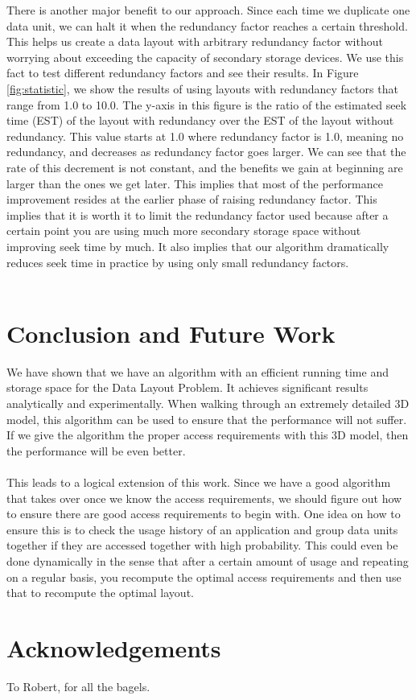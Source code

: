 \documentclass[conference]{acmsiggraph}
\begin{document}
There is another major benefit to our approach. Since each time we duplicate one data unit, we can halt it when the redundancy factor reaches a certain threshold. This helps us create a data layout with arbitrary redundancy factor without worrying about exceeding the capacity of secondary storage devices. We use this fact to test different redundancy factors and see their results. In Figure \ref{fig:statistic}, we show the results of using layouts with redundancy factors that range from 1.0 to 10.0. The y-axis in this figure is the ratio of the estimated seek time (EST) of the layout with redundancy over the EST of the layout without redundancy. This value starts at 1.0 where redundancy factor is 1.0, meaning no redundancy, and decreases as redundancy factor goes larger. We can see that the rate of this decrement is not constant, and the benefits we gain at beginning are larger than the ones we get later. This implies that most of the performance improvement resides at the earlier phase of raising redundancy factor. This implies that it is worth it to limit the redundancy factor used because after a certain point you are using much more secondary storage space without improving seek time by much. It also implies that our algorithm dramatically reduces seek time in practice by using only small redundancy factors. \\  
\\


\section{Conclusion and Future Work}

We have shown that we have an algorithm with an efficient running time and storage space for the Data Layout Problem. It achieves significant results analytically and experimentally. When walking through an extremely detailed 3D model, this algorithm can be used to ensure that the performance will not suffer. If we give the algorithm the proper access requirements with this 3D model, then the performance will be even better.\\
\\
This leads to a logical extension of this work. Since we have a good algorithm that takes over once we know the access requirements, we should figure out how to ensure there are good access requirements to begin with. One idea on how to ensure this is to check the usage history of an application and group data units together if they are accessed together with high probability. This could even be done dynamically in the sense that after a certain amount of usage and repeating on a regular basis, you recompute the optimal access requirements and then use that to recompute the optimal layout. 

\section{Acknowledgements}

To Robert, for all the bagels.



\end{document}
